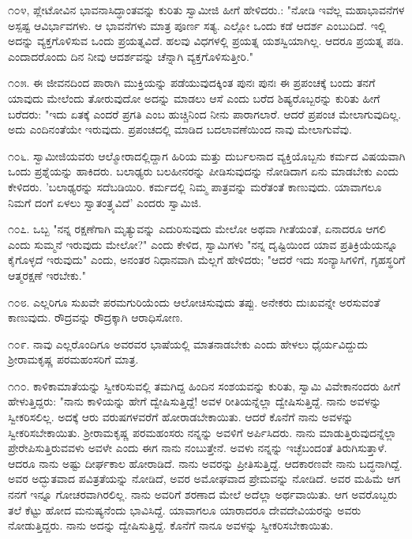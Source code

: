 ೧೦೪, ಪ್ಲೇಟೋವಿನ ಭಾವನಾಸಿದ್ಧಾಂತವನ್ನು  ಕುರಿತು ಸ್ವಾಮೀಜಿ ಹೀಗೆ ಹೇಳಿದರು.: "ನೋಡಿ ಇವೆಲ್ಲ ಮಹಾಭಾವನೆಗಳ ಅಸ್ಪಷ್ಟ ಆವಿರ್ಭಾವಗಳು. ಆ ಭಾವನೆಗಳು ಮಾತ್ರ ಪೂರ್ಣ ಸತ್ಯ. ಎಲ್ಲೋ ಒಂದು ಕಡೆ ಆದರ್ಶ ಎಂಬುದಿದೆ. ಇಲ್ಲಿ ಅದನ್ನು ವ್ಯಕ್ತಗೊಳಿಸುವ ಒಂದು ಪ್ರಯತ್ನವಿದೆ. ಹಲವು ವಿಧಗಳಲ್ಲಿ ಪ್ರಯತ್ನ ಯಶಸ್ವಿಯಾಗಿಲ್ಲ. ಆದರೂ ಪ್ರಯತ್ನ ಪಡಿ. ಎಂದಾದರೊಂದು ದಿನ ನೀವು ಆದರ್ಶವನ್ನು ಚೆನ್ನಾಗಿ ವ್ಯಕ್ತಗೊಳಿಸುತ್ತೀರಿ."

೧೦೫. ಈ ಜೀವನದಿಂದ ಪಾರಾಗಿ ಮುಕ್ತಿಯನ್ನು ಪಡೆಯುವುದಕ್ಕಿಂತ ಪುನಃ ಪುನಃ ಈ ಪ್ರಪಂಚಕ್ಕೆ ಬಂದು ತನಗೆ ಯಾವುದು ಮೇಲೆಂದು ತೋರುವುದೋ ಅದನ್ನು ಮಾಡಲು ಆಸೆ ಎಂದು ಬರೆದ ಶಿಷ್ಯರೊಬ್ಬರನ್ನು ಕುರಿತು ಹೀಗೆ ಬರೆದರು: "ಇದು ಏತಕ್ಕೆ ಎಂದರೆ ಪ್ರಗತಿ ಎಂಬ ಹುಚ್ಚಿನಿಂದ ನೀನು ಪಾರಾಗಲಾರೆ. ಆದರೆ ಪ್ರಪಂಚ ಮೇಲಾಗುವುದಿಲ್ಲ. ಅದು ಎಂದಿನಂತೆಯೇ ಇರುವುದು. ಪ್ರಪಂಚದಲ್ಲಿ ಮಾಡಿದ ಬದಲಾವಣೆಯಿಂದ ನಾವು ಮೇಲಾಗುವೆವು.

೧೦೬. ಸ್ವಾಮೀಜಿಯವರು ಆಲ್ಮೋರಾದಲ್ಲಿದ್ದಾಗ ಹಿರಿಯ ಮತ್ತು ದುರ್ಬಲನಾದ ವ್ಯಕ್ತಿಯೊಬ್ಬನು ಕರ್ಮದ ವಿಷಯವಾಗಿ ಒಂದು ಪ್ರಶ್ನೆಯನ್ನು ಹಾಕಿದರು. ಬಲಾಢ್ಯರು ಬಲಹೀನರನ್ನು ಪೀಡಿಸುವುದನ್ನು ನೋಡಿದಾಗ ಏನು ಮಾಡಬೇಕು ಎಂದು ಕೇಳಿದರು. 'ಬಲಾಢ್ಯರನ್ನು ಸದೆಬಡಿಯಿರಿ. ಕರ್ಮದಲ್ಲಿ ನಿಮ್ಮ ಪಾತ್ರವನ್ನು ಮರೆತಂತೆ ಕಾಣುವುದು. ಯಾವಾಗಲೂ ನಿಮಗೆ ದಂಗೆ ಏಳಲು ಸ್ವಾತಂತ್ರ್ಯವಿದೆ' ಎಂದರು ಸ್ವಾಮಿಜಿ.

೧೦೭. ಒಬ್ಬ "ನನ್ನ ರಕ್ಷಣೆಗಾಗಿ ಮೃತ್ಯುವನ್ನು ಎದುರಿಸುವುದು ಮೇಲೋ ಅಥವಾ ಗೀತೆಯಂತೆ, ಏನಾದರೂ ಆಗಲಿ ಎಂದು ಸುಮ್ಮನೆ ಇರುವುದು ಮೇಲೋ?" ಎಂದು ಕೇಳಿದ, ಸ್ವಾಮಿಗಳು "ನನ್ನ ದೃಷ್ಟಿಯಿಂದ ಯಾವ ಪ್ರತಿಕ್ರಿಯೆಯನ್ನೂ ಕೈಗೊಳ್ಳದೆ ಇರುವುದು" ಎಂದು, ಅನಂತರ ನಿಧಾನವಾಗಿ ಮೆಲ್ಲಗೆ ಹೇಳಿದರು; "ಆದರೆ ಇದು ಸಂನ್ಯಾಸಿಗಳಿಗೆ, ಗೃಹಸ್ಥರಿಗೆ ಆತ್ಮರಕ್ಷಣೆ ಇರಬೇಕು."

೧೦೮. ಎಲ್ಲರಿಗೂ ಸುಖವೇ ಪರಮಗುರಿಯೆಂದು ಆಲೋಚಿಸುವುದು ತಪ್ಪು. ಅನೇಕರು ದುಃಖವನ್ನೇ ಅರಸುವಂತೆ ಕಾಣುವುದು. ರೌದ್ರವನ್ನು ರೌದ್ರಕ್ಕಾಗಿ ಆರಾಧಿಸೋಣ.

೧೦೯. ನಾವು ಎಲ್ಲರೊಂದಿಗೂ ಅವರವರ ಭಾಷೆಯಲ್ಲಿ ಮಾತನಾಡಬೇಕು ಎಂದು ಹೇಳಲು ಧೈರ್ಯವಿದ್ದುದು ಶ‍್ರೀರಾಮಕೃಷ್ಣ ಪರಮಹಂಸರಿಗೆ ಮಾತ್ರ.

೧೧೦. ಕಾಳಿಕಾಮಾತೆಯನ್ನು ಸ್ವೀಕರಿಸುವಲ್ಲಿ ತಮಗಿದ್ದ ಹಿಂದಿನ ಸಂಶಯವನ್ನು ಕುರಿತು, ಸ್ವಾಮಿ ವಿವೇಕಾನಂದರು ಹೀಗೆ ಹೇಳುತ್ತಿದ್ದರು: "ನಾನು ಕಾಳಿಯನ್ನು ಹೇಗೆ ದ್ವೇಷಿಸುತ್ತಿದ್ದೆ! ಅವಳ ರೀತಿಯನ್ನೆಲ್ಲಾ ದ್ವೇಷಿಸುತ್ತಿದ್ದೆ. ನಾನು ಅವಳನ್ನು ಸ್ವೀಕರಿಸಲಿಲ್ಲ. ಅದಕ್ಕೆ ಆರು ವರುಷಗಳವರೆಗೆ ಹೋರಾಡಬೇಕಾಯಿತು. ಆದರೆ ಕೊನೆಗೆ ನಾನು ಅವಳನ್ನು ಸ್ವೀಕರಿಸಬೇಕಾಯಿತು. ಶ‍್ರೀರಾಮಕೃಷ್ಣ ಪರಮಹಂಸರು ನನ್ನನ್ನು ಅವಳಿಗೆ ಅರ್ಪಿಸಿದರು. ನಾನು ಮಾಡುತ್ತಿರುವುದನ್ನೆಲ್ಲಾ ಪ್ರೇರೇಪಿಸುತ್ತಿರುವವಳು ಅವಳೇ ಎಂದು ಈಗ ನಾನು ನಂಬುತ್ತೇನೆ. ಅವಳು ನನ್ನನ್ನು ಇಚ್ಛೆಬಂದಂತೆ ತಿರುಗಿಸುತ್ತಾಳೆ. ಆದರೂ ನಾನು ಅಷ್ಟು ದೀರ್ಘಕಾಲ ಹೋರಾಡಿದೆ. ನಾನು ಅವರನ್ನು ಪ್ರೀತಿಸುತ್ತಿದ್ದೆ. ಆದಕಾರಣವೇ ನಾನು ಬದ್ಧನಾಗಿದ್ದೆ. ಅವರ ಅದ್ಭುತವಾದ ಪವಿತ್ರತೆಯನ್ನು ನೋಡಿದೆ, ಅವರ ಅಮೋಘವಾದ ಪ್ರೇಮವನ್ನು ನೋಡಿದೆ. ಅವರ ಮಹಿಮೆ ಆಗ ನನಗೆ ಇನ್ನೂ ಗೋಚರವಾಗಿರಲಿಲ್ಲ. ನಾನು ಅವರಿಗೆ ಶರಣಾದ ಮೇಲೆ ಅದೆಲ್ಲಾ ಅರ್ಥವಾಯಿತು. ಆಗ ಅವರೊಬ್ಬರು ತಲೆ ಕೆಟ್ಟು ಹೋದ ಮನುಷ್ಯನೆಂದು ಭಾವಿಸಿದ್ದೆ. ಯಾವಾಗಲೂ ಯಾರಾದರೂ ದೇವದೇವಿಯರನ್ನು ಅವರು ನೋಡುತ್ತಿದ್ದರು. ನಾನು ಅದನ್ನು ದ್ವೇಷಿಸುತ್ತಿದ್ದೆ. ಕೊನೆಗೆ ನಾನೂ ಅವಳನ್ನು ಸ್ವೀಕರಿಸಬೇಕಾಯಿತು.

